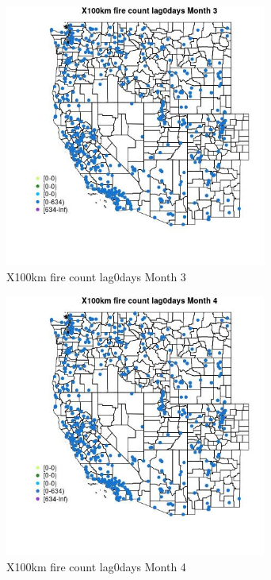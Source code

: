 \begin{figure} 
\centering  
\includegraphics[width=0.77\textwidth]{Code_Outputs/Report_ML_input_PM25_Step4_part_e_de_duplicated_aves_compiled_2019-05-14wNAs_MapObsMo3X100km_fire_count_lag0days.jpg} 
\caption{\label{fig:Report_ML_input_PM25_Step4_part_e_de_duplicated_aves_compiled_2019-05-14wNAsMapObsMo3X100km_fire_count_lag0days}X100km fire count lag0days Month 3} 
\end{figure} 
 

\begin{figure} 
\centering  
\includegraphics[width=0.77\textwidth]{Code_Outputs/Report_ML_input_PM25_Step4_part_e_de_duplicated_aves_compiled_2019-05-14wNAs_MapObsMo4X100km_fire_count_lag0days.jpg} 
\caption{\label{fig:Report_ML_input_PM25_Step4_part_e_de_duplicated_aves_compiled_2019-05-14wNAsMapObsMo4X100km_fire_count_lag0days}X100km fire count lag0days Month 4} 
\end{figure} 
 

